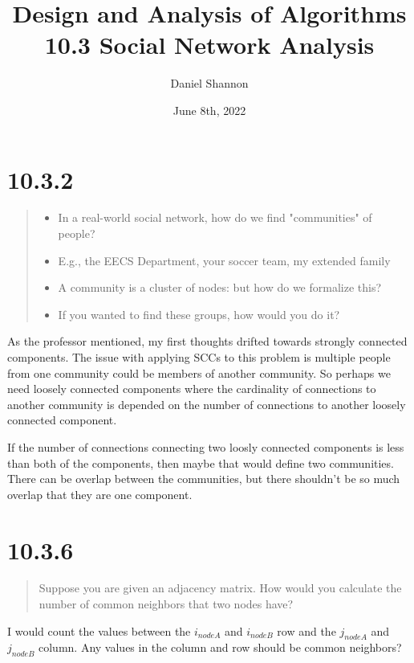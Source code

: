 \documentclass[12pt, letterpaper, twoside]{article}
\title{%
Design and Analysis of Algorithms\\
\large 10.3 Social Network Analysis
}
\author{Daniel Shannon}
\date{June 8th, 2022}
\begin{document}
\begin{titlepage}
\maketitle
\end{titlepage}

\section*{10.3.2}
\begin{quote}
  \begin{itemize}
    \item In a real-world social network, how do we find "communities" of people?
    \item E.g., the EECS Department, your soccer team, my extended family
    \item A community is a cluster of nodes: but how do we formalize this?
    \item If you wanted to find these groups, how would you do it?
  \end{itemize}
\end{quote}

As the professor mentioned, my first thoughts drifted towards strongly connected components.
The issue with applying SCCs to this problem is multiple people from one community could
be members of another community. So perhaps we need loosely connected components where 
the cardinality of connections to another community is depended on the number of connections to another loosely connected component.

If the number of connections connecting two loosly connected components is less than both of the 
components, then maybe that would define two communities. There can be overlap between the communities,
but there shouldn't be so much overlap that they are one component.

\section*{10.3.6}
\begin{quote}
  Suppose you are given an adjacency matrix.
  How would you calculate the number of common neighbors that two nodes have?
\end{quote}

I would count the values between the $i_{nodeA}$ and $i_{nodeB}$ row and the $j_{nodeA}$ and $j_{nodeB}$ column. Any values in the column and row should be common neighbors?
\end{document}
